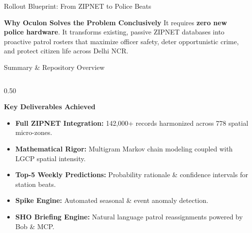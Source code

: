\documentclass[aspectratio=169,10pt]{beamer}
\begin{document}
\begin{frame}{Rollout Blueprint: From ZIPNET to Police Beats}
  \vspace{0.3cm}
  \begin{alertblock}{\textbf{Why Oculon Solves the Problem Conclusively}}
    \centering \small
    It requires \textbf{zero new police hardware}. It transforms existing, passive ZIPNET databases into proactive patrol rosters that maximize officer safety, deter opportunistic crime, and protect citizen life across Delhi NCR.
  \end{alertblock}
\end{frame}

\begin{frame}{Summary \& Repository Overview}
  \begin{columns}[T]
    \begin{column}{0.50\textwidth}
      \begin{block}{\textbf{Key Deliverables Achieved}}
        \footnotesize
        \begin{itemize}\itemsep=0.3em
          \item \textbf{Full ZIPNET Integration:} 142,000+ records harmonized across 778 spatial micro-zones.
          \item \textbf{Mathematical Rigor:} Multigram Markov chain modeling coupled with LGCP spatial intensity.
          \item \textbf{Top-5 Weekly Predictions:} Probability rationale \& confidence intervals for station beats.
          \item \textbf{Spike Engine:} Automated seasonal \& event anomaly detection.
          \item \textbf{SHO Briefing Engine:} Natural language patrol reassignments powered by Bob \& MCP.
        \end{itemize}
      \end{block}
    \end{column}


\end{columns}
\end{frame}
\end{document}
